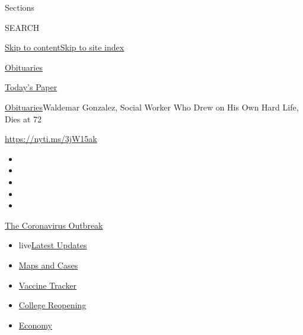 Sections

SEARCH

\protect\hyperlink{site-content}{Skip to
content}\protect\hyperlink{site-index}{Skip to site index}

\href{https://www.nytimes3xbfgragh.onion/section/obituaries}{Obituaries}

\href{https://myaccount.nytimes3xbfgragh.onion/auth/login?response_type=cookie\&client_id=vi}{}

\href{https://www.nytimes3xbfgragh.onion/section/todayspaper}{Today's
Paper}

\href{/section/obituaries}{Obituaries}\textbar{}Waldemar Gonzalez,
Social Worker Who Drew on His Own Hard Life, Dies at 72

\url{https://nyti.ms/3jW15ak}

\begin{itemize}
\item
\item
\item
\item
\item
\end{itemize}

\href{https://www.nytimes3xbfgragh.onion/news-event/coronavirus?action=click\&pgtype=Article\&state=default\&region=TOP_BANNER\&context=storylines_menu}{The
Coronavirus Outbreak}

\begin{itemize}
\tightlist
\item
  live\href{https://www.nytimes3xbfgragh.onion/2020/08/03/world/coronavirus-covid-19.html?action=click\&pgtype=Article\&state=default\&region=TOP_BANNER\&context=storylines_menu}{Latest
  Updates}
\item
  \href{https://www.nytimes3xbfgragh.onion/interactive/2020/us/coronavirus-us-cases.html?action=click\&pgtype=Article\&state=default\&region=TOP_BANNER\&context=storylines_menu}{Maps
  and Cases}
\item
  \href{https://www.nytimes3xbfgragh.onion/interactive/2020/science/coronavirus-vaccine-tracker.html?action=click\&pgtype=Article\&state=default\&region=TOP_BANNER\&context=storylines_menu}{Vaccine
  Tracker}
\item
  \href{https://www.nytimes3xbfgragh.onion/2020/08/02/us/covid-college-reopening.html?action=click\&pgtype=Article\&state=default\&region=TOP_BANNER\&context=storylines_menu}{College
  Reopening}
\item
  \href{https://www.nytimes3xbfgragh.onion/live/2020/08/03/business/stock-market-today-coronavirus?action=click\&pgtype=Article\&state=default\&region=TOP_BANNER\&context=storylines_menu}{Economy}
\end{itemize}

